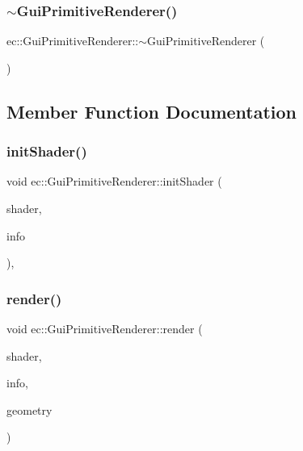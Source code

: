 \subsubsection{\texorpdfstring{$\sim$\+Gui\+Primitive\+Renderer()}{~GuiPrimitiveRenderer()}}
{\footnotesize\ttfamily ec\+::\+Gui\+Primitive\+Renderer\+::$\sim$\+Gui\+Primitive\+Renderer (\begin{DoxyParamCaption}{ }\end{DoxyParamCaption})\hspace{0.3cm}{\ttfamily [default]}}



\subsection{Member Function Documentation}
\mbox{\label{classec_1_1_gui_primitive_renderer_a50485915bde54b1e786de6bd2017d4dd}} 
\subsubsection{\texorpdfstring{init\+Shader()}{initShader()}}
{\footnotesize\ttfamily void ec\+::\+Gui\+Primitive\+Renderer\+::init\+Shader (\begin{DoxyParamCaption}\item[{\mbox{\hyperlink{classec_1_1_shader}{Shader}} $\ast$}]{shader,  }\item[{const \mbox{\hyperlink{structec_1_1_gui_shader_info_object}{Gui\+Shader\+Info\+Object}} \&}]{info }\end{DoxyParamCaption})\hspace{0.3cm}{\ttfamily [static]}, {\ttfamily [protected]}}

\mbox{\label{classec_1_1_gui_primitive_renderer_abee889f2ebf94c6ae71cc7b39098a002}} 
\subsubsection{\texorpdfstring{render()}{render()}}
{\footnotesize\ttfamily void ec\+::\+Gui\+Primitive\+Renderer\+::render (\begin{DoxyParamCaption}\item[{\mbox{\hyperlink{classec_1_1_shader}{Shader}} $\ast$}]{shader,  }\item[{const \mbox{\hyperlink{structec_1_1_gui_shader_info_object}{Gui\+Shader\+Info\+Object}} \&}]{info,  }\item[{\mbox{\hyperlink{classec_1_1_geometry}{Geometry}} $\ast$}]{geometry }\end{DoxyParamCaption})}



